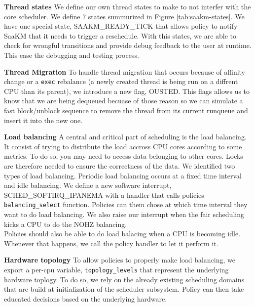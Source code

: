 \par \textbf{Thread states} We define our own thread states to make to not interfer with the core scheduler. We define 7 states summurized in Figure \ref{tab:saakm-states}. We have one special state, SAAKM\_READY\_TICK that allows policy to notify SaaKM that it needs to trigger a reschedule. With this states, we are able to check for wrongful transitions and provide debug feedback to the user at runtime. This ease the debugging and testing process. \newline

\par \textbf{Thread Migration} To handle thread migration that occurs because of affinity change or a \texttt{exec} rebalance (a newly created thread is being run on a diffrent CPU than its parent), we introduce a new flag, OUSTED. This flags allows us to know that we are being dequeued becuase of those reason so we can simulate a fast block/unblock sequence to remove the thread from its current runqueue and insert it into the new one. \newline

\par \textbf{Load balancing} A central and critical part of scheduling is the load balancing. It consist of trying to distribute the load accross CPU cores according to some metrics. To do so, you may need to access data belonging to other cores. Locks are therefore needed to ensure the correctness of the data. We identified two types of load balancing. Periodic load balancing occurs at a fixed time interval and idle balancing. We define a new software interrupt, SCHED\_SOFTIRQ\_IPANEMA with a handler that calls policies \texttt{balancing\_select} function. Policies can them chose at which time interval they want to do load balancing. We also raise our interrupt when the fair scheduling kicks a CPU to do the NOHZ balancing. \\
Policies should also be able to do load balacing when a CPU is becoming idle. Whenever that happens, we call the policy handler to let it perform it. \newline

\par \textbf{Hardware topology} To allow policies to properly make load balancing, we export a per-cpu variable, \texttt{topology\_levels} that represent the underlying hardware toplogy. To do so, we rely on the already existing scheduling domains that are build at initialization of the scheduler subsystem. Policy can then take educated decisions based on the underlying hardware.\newline

